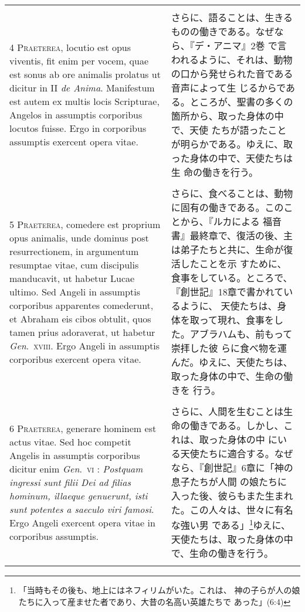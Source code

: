 \documentclass[10pt]{jsarticle} %
\begin{document}
\begin{longtable}{p{21em}p{21em}}
\\\\


{\scshape 4 Praeterea}, locutio est opus viventis, fit
enim per vocem, quae est sonus ab ore animalis prolatus ut dicitur in II
{\itshape de Anima}. Manifestum est autem ex multis locis Scripturae, Angelos in
assumptis corporibus locutos fuisse. Ergo in corporibus assumptis
exercent opera vitae.
&
さらに、語ることは、生きるものの働きである。なぜなら、『デ・アニマ』2巻
 で言われるように、それは、動物の口から発せられた音である音声によって生
 じるからである。ところが、聖書の多くの箇所から、取った身体の中で、天使
 たちが語ったことが明らかである。ゆえに、取った身体の中で、天使たちは生
 命の働きを行う。

\\\\



{\scshape 5 Praeterea}, comedere est proprium opus
animalis, unde dominus post resurrectionem, in argumentum resumptae
vitae, cum discipulis manducavit, ut habetur Lucae ultimo. Sed Angeli in
assumptis corporibus apparentes comederunt, et Abraham eis cibos
obtulit, quos tamen prius adoraverat, ut habetur {\itshape Gen}.~{\scshape xviii}. Ergo Angeli
in assumptis corporibus exercent opera vitae.
&
さらに、食べることは、動物に固有の働きである。このことから、『ルカによる
 福音書』最終章で、復活の後、主は弟子たちと共に、生命が復活したことを示
 すために、食事をしている。ところで、『創世記』18章で書かれているように、
 天使たちは、身体を取って現れ、食事をした。アブラハムも、前もって崇拝した彼
 らに食べ物を運んだ。ゆえに、天使たちは、取った身体の中で、生命の働きを
 行う。

\\\\


{\scshape 6 Praeterea}, generare hominem est actus
vitae. Sed hoc competit Angelis in assumptis corporibus dicitur enim
{\itshape Gen}.~{\scshape vi} : {\itshape Postquam ingressi sunt filii Dei ad filias hominum, illaeque
genuerunt, isti sunt potentes a saeculo viri famosi}. Ergo Angeli
exercent opera vitae in corporibus assumptis.

&

さらに、人間を生むことは生命の働きである。しかし、これは、取った身体の中
 にいる天使たちに適合する。なぜなら、『創世記』6章に「神の息子たちが人間
 の娘たちに入った後、彼らもまた生まれた。この人々は、世々に有名な強い男
 である」\footnote{「当時もその後も、地上にはネフィリムがいた。これは、
 神の子らが人の娘たちに入って産ませた者であり、大昔の名高い英雄たちで
 あった」(6:4)}ゆえに、天使たちは、取った身体の中で、生命の働きを行う。
\\\\




\end{longtable}
\end{document}
